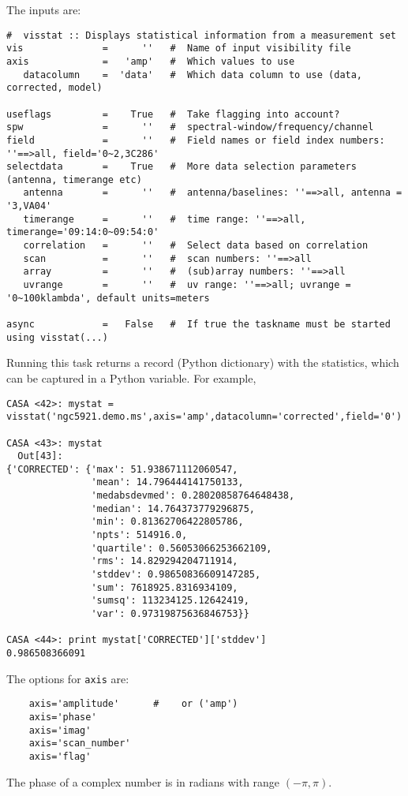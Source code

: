 The inputs are:
\small
\begin{verbatim}
#  visstat :: Displays statistical information from a measurement set
vis              =      ''   #  Name of input visibility file
axis             =   'amp'   #  Which values to use
   datacolumn    =  'data'   #  Which data column to use (data, corrected, model)

useflags         =    True   #  Take flagging into account?
spw              =      ''   #  spectral-window/frequency/channel
field            =      ''   #  Field names or field index numbers: ''==>all, field='0~2,3C286'
selectdata       =    True   #  More data selection parameters (antenna, timerange etc)
   antenna       =      ''   #  antenna/baselines: ''==>all, antenna = '3,VA04'
   timerange     =      ''   #  time range: ''==>all, timerange='09:14:0~09:54:0'
   correlation   =      ''   #  Select data based on correlation
   scan          =      ''   #  scan numbers: ''==>all
   array         =      ''   #  (sub)array numbers: ''==>all
   uvrange       =      ''   #  uv range: ''==>all; uvrange = '0~100klambda', default units=meters

async            =   False   #  If true the taskname must be started using visstat(...)
\end{verbatim}
\normalsize
Running this task returns a record (Python dictionary) with the
statistics, which can be captured in a Python variable.
For example,
\small
\begin{verbatim}
CASA <42>: mystat = visstat('ngc5921.demo.ms',axis='amp',datacolumn='corrected',field='0')

CASA <43>: mystat
  Out[43]: 
{'CORRECTED': {'max': 51.938671112060547,
               'mean': 14.796444141750133,
               'medabsdevmed': 0.28020858764648438,
               'median': 14.764373779296875,
               'min': 0.81362706422805786,
               'npts': 514916.0,
               'quartile': 0.56053066253662109,
               'rms': 14.829294204711914,
               'stddev': 0.98650836609147285,
               'sum': 7618925.8316934109,
               'sumsq': 113234125.12642419,
               'var': 0.97319875636846753}}

CASA <44>: print mystat['CORRECTED']['stddev']
0.986508366091
\end{verbatim}
\normalsize

The options for {\tt axis} are:
\small
\begin{verbatim}
    axis='amplitude'      #    or ('amp')
    axis='phase'
    axis='imag'
    axis='scan_number'
    axis='flag'
\end{verbatim}
\normalsize
The phase of a complex number is in radians with range $(-\pi, \pi)$.

